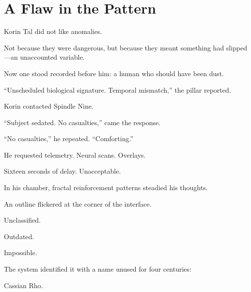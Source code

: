 \chapter{A Flaw in the Pattern}

Korin Tal did not like anomalies.

Not because they were dangerous, but because they meant something had slipped—an unaccounted variable.

Now one stood recorded before him: a human who should have been dust.

“Unscheduled biological signature. Temporal mismatch,” the pillar reported.

Korin contacted Spindle Nine.

“Subject sedated. No casualties,” came the response.

“No casualties,” he repeated. “Comforting.”

He requested telemetry. Neural scans. Overlays.

Sixteen seconds of delay. Unacceptable.

In his chamber, fractal reinforcement patterns steadied his thoughts.

An outline flickered at the corner of the interface.

Unclassified.

Outdated.

Impossible.

The system identified it with a name unused for four centuries:

Cassian Rho.
